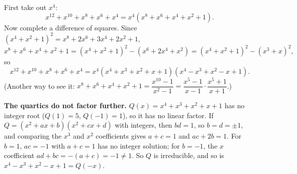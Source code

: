 First take out $x^4$:
\[x^{12}+x^{10}+x^8+x^6+x^4=x^4\left(x^8+x^6+x^4+x^2+1\right).\]
Now complete a difference of squares. Since $\left(x^4+x^2+1\right)^2=x^8+2x^6+3x^4+2x^2+1$,
\[x^8+x^6+x^4+x^2+1=\left(x^4+x^2+1\right)^2-\left(x^6+2x^4+x^2\right)=\left(x^4+x^2+1\right)^2-\left(x^3+x\right)^2,\]
so
\[x^{12}+x^{10}+x^8+x^6+x^4=\boxed{x^4\left(x^4+x^3+x^2+x+1\right)\left(x^4-x^3+x^2-x+1\right)}.\]
(Another way to see it: $x^8+x^6+x^4+x^2+1=\dfrac{x^{10}-1}{x^2-1}=\dfrac{x^5-1}{x-1}\cdot\dfrac{x^5+1}{x+1}$.)

\textbf{The quartics do not factor further.} $Q(x)=x^4+x^3+x^2+x+1$ has no integer root ($Q(1)=5$, $Q(-1)=1$), so it has no linear factor. If $Q=\left(x^2+ax+b\right)\left(x^2+cx+d\right)$ with integers, then $bd=1$, so $b=d=\pm1$, and comparing the $x^3$ and $x^2$ coefficients gives $a+c=1$ and $ac+2b=1$. For $b=1$, $ac=-1$ with $a+c=1$ has no integer solution; for $b=-1$, the $x$ coefficient $ad+bc=-(a+c)=-1\ne1$. So $Q$ is irreducible, and so is $x^4-x^3+x^2-x+1=Q(-x)$.

